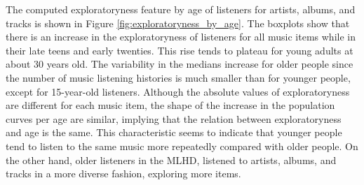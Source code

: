 The computed exploratoryness feature by age of listeners for artists, albums, and tracks is shown in Figure \ref{fig:exploratoryness_by_age}. The boxplots show that there is an increase in the exploratoryness of listeners for all music items while in their late teens and early twenties. This rise tends to plateau for young adults at about 30 years old. 
The variability in the medians increase for older people since the number of music listening histories is much smaller than for younger people, except for 15-year-old listeners.
Although the absolute values of exploratoryness are different for each music item, the shape of the increase in the population curves per age are similar, implying that the relation between exploratoryness and age is the same.
This characteristic seems to indicate that younger people tend to listen to the same music more repeatedly compared with older people. On the other hand, older listeners in the MLHD, listened to artists, albums, and tracks in a more diverse fashion, exploring more items. 


